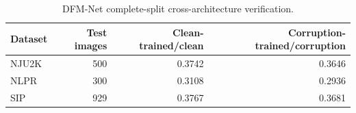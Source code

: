 \begin{table}[t]\centering\caption{DFM-Net complete-split cross-architecture verification.}\label{tab:dfm_full}\begin{tabular}{lrrr}\toprule Dataset & Test images & Clean-trained/clean & Corruption-trained/corruption \\ \midrule
NJU2K & 500 & 0.3742 & 0.3646 \\
NLPR & 300 & 0.3108 & 0.2936 \\
SIP & 929 & 0.3767 & 0.3681 \\
\bottomrule\end{tabular}\end{table}
